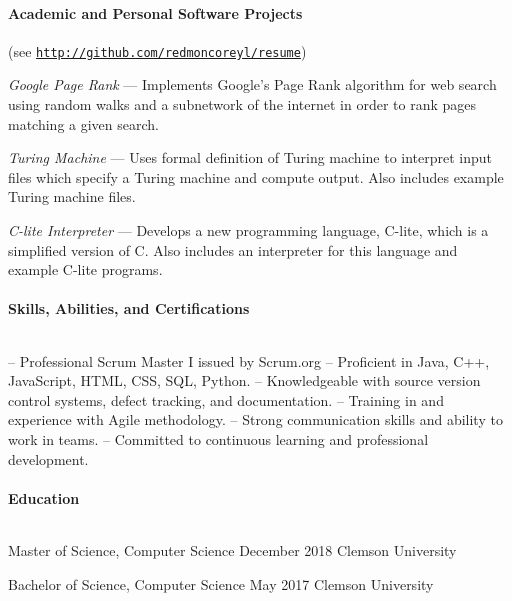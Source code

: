 \documentclass{article}
\begin{document}
  \paragraph{Academic and Personal Software Projects} \hfill (see \href{http://github.com/redmoncoreyl/resume}{\texttt{http://github.com/redmoncoreyl/resume}})%

  \hangindent=0.5in
  \textit{Google Page Rank} --- Implements Google's Page Rank algorithm
  for web search using random walks and a subnetwork of the internet in order to
  rank pages matching a given search.

  \hangindent=0.5in
	\textit{Turing Machine} --- Uses formal definition of Turing machine to
  interpret input files which specify a Turing machine and compute output. Also includes
  example Turing machine files.

  \hangindent=0.5in
	\textit{C-lite Interpreter} --- Develops a new programming language, C-lite, which
  is a simplified version of C. Also includes an interpreter for this language and
  example C-lite programs.

  \paragraph{Skills, Abilities, and Certifications} $ $

  \hangindent=0.4in
  -- Professional Scrum Master I issued by Scrum.org \newline
  -- Proficient in Java, C++, JavaScript, HTML, CSS, SQL, Python. \newline
  -- Knowledgeable with source version control systems, defect tracking, and documentation. \newline
  -- Training in and experience with Agile methodology. \newline
  -- Strong communication skills and ability to work in teams. \newline
  -- Committed to continuous learning and professional development.

  \paragraph{Education} $ $

  \hangindent=0.8in
  Master of Science, Computer Science \hfill December 2018 \newline
  Clemson University \newline

  \hangindent=0.8in
  Bachelor of Science, Computer Science \hfill May 2017 \newline
  Clemson University
  
\end{document}
